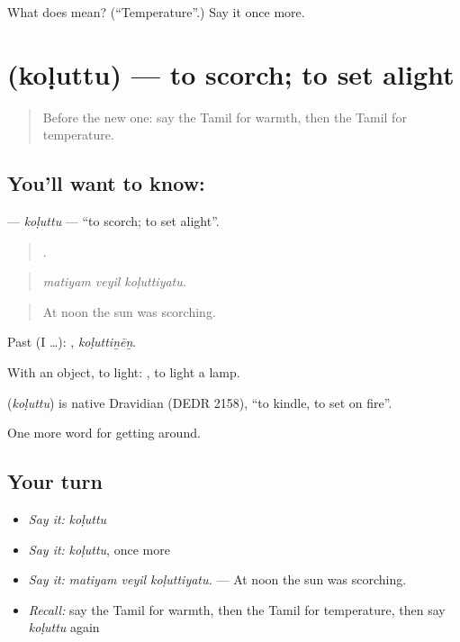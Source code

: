 \begin{tcolorbox}[breakable,colback=teal!4,colframe=teal!35!black,title={Before you move on}]
What does  mean? (\textquotedblleft{}Temperature\textquotedblright{}.) Say it once more.
\end{tcolorbox}
\section[\texorpdfstring{\ta{கொளுத்து} (koḷuttu)}{கொளுத்து (koḷuttu)}]{ (koḷuttu) — to scorch; to set alight}

\label{lesson:TA-C427-koluttu}



\begin{quote}
Before the new one: say the Tamil for warmth, then the Tamil for temperature.
\end{quote}

\subsection*{You'll want to know: }
\textbf{} — \emph{koḷuttu} — \textquotedblleft{}to scorch; to set alight\textquotedblright{}.

\begin{quote}
  .
\end{quote}

\begin{quote}
\emph{matiyam veyil koḷuttiyatu.}
\end{quote}

\begin{quote}
At noon the sun was scorching.
\end{quote}

Past (I …): , \emph{koḷuttiṉēṉ}.

With an object, to light:  , to light a lamp.

\begin{cousinweb}
\textbf{} (\emph{koḷuttu}) is native Dravidian (DEDR 2158), \textquotedblleft{}to kindle, to set on fire\textquotedblright{}.
\end{cousinweb}

\begin{grammarlens}[title={What you've built}]
One more word for getting around.
\end{grammarlens}

\subsection*{Your turn}
\begin{itemize}
\raggedright
  \item \emph{Say it:} \emph{koḷuttu}
  \item \emph{Say it:} \emph{koḷuttu}, once more
  \item \emph{Say it:} \emph{matiyam veyil koḷuttiyatu.} — At noon the sun was scorching.
  \item \emph{Recall:} say the Tamil for warmth, then the Tamil for temperature, then say \emph{koḷuttu} again
\end{itemize}

